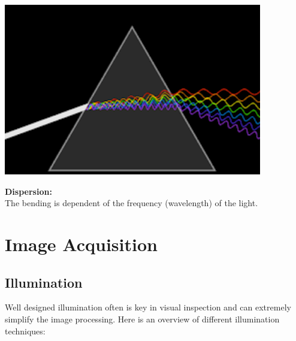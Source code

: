\documentclass[a4paper, fontsize=8pt, landscape, DIV=1]{scrartcl}
\begin{document}
\begin{multicols*}{4}
\begin{minipage}[b]{0.59\columnwidth}
\begin{flushleft}
				\vspace{1.1cm}
			\end{flushleft}
		\end{minipage}
		\par 
		\begin{minipage}[t]{0.49\columnwidth}
			\begin{flushleft}
				\includegraphics[width=\columnwidth]{images/Introduction/dispersion.png}\\
			\end{flushleft}
		\end{minipage}
		\begin{minipage}[b]{0.49\columnwidth}
			\begin{flushleft}
				\textbf{Dispersion:}\\
				The bending is dependent of the frequency (wavelength) of the light. 
				\vspace{0.2cm}
			\end{flushleft}
		\end{minipage}
		\vfill\null
		\columnbreak

		\section{Image Acquisition}	
		\subsection{Illumination}
		Well designed illumination often is key in visual inspection and can extremely simplify the image processing. Here is an overview of different illumination techniques:
		

\end{multicols*}
\end{document}
